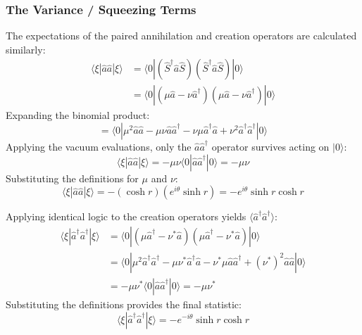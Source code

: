 {\subsubsection{The Variance / Squeezing Terms}
The expectations of the paired annihilation and creation operators are calculated similarly:
\begin{align*}
\langle \xi | \hat{a}\hat{a} | \xi \rangle &= \langle 0 | (\hat{S}^\dagger \hat{a} \hat{S}) (\hat{S}^\dagger \hat{a} \hat{S}) | 0 \rangle \\
&= \langle 0 | (\mu\hat{a} - \nu\hat{a}^\dagger)(\mu\hat{a} - \nu\hat{a}^\dagger) | 0 \rangle
\end{align*}
Expanding the binomial product:
\begin{equation*}
= \langle 0 | \mu^2 \hat{a}\hat{a} - \mu\nu \hat{a}\hat{a}^\dagger - \nu\mu \hat{a}^\dagger\hat{a} + \nu^2 \hat{a}^\dagger\hat{a}^\dagger | 0 \rangle
\end{equation*}
Applying the vacuum evaluations, only the $\hat{a}\hat{a}^\dagger$ operator survives acting on $|0\rangle$:
\begin{equation*}
\langle \xi | \hat{a}\hat{a} | \xi \rangle = -\mu\nu \langle 0 | \hat{a}\hat{a}^\dagger | 0 \rangle = -\mu\nu
\end{equation*}
Substituting the definitions for $\mu$ and $\nu$:
\begin{equation}
\langle \xi | \hat{a}\hat{a} | \xi \rangle = -(\cosh r)(e^{i\theta}\sinh r) = -e^{i\theta}\sinh r \cosh r
\end{equation}

Applying identical logic to the creation operators yields $\langle \hat{a}^\dagger\hat{a}^\dagger \rangle$:
\begin{align*}
\langle \xi | \hat{a}^\dagger\hat{a}^\dagger | \xi \rangle &= \langle 0 | (\mu\hat{a}^\dagger - \nu^*\hat{a})(\mu\hat{a}^\dagger - \nu^*\hat{a}) | 0 \rangle \\
&= \langle 0 | \mu^2 \hat{a}^\dagger\hat{a}^\dagger - \mu\nu^* \hat{a}^\dagger\hat{a} - \nu^*\mu \hat{a}\hat{a}^\dagger + (\nu^*)^2 \hat{a}\hat{a} | 0 \rangle \\
&= -\mu\nu^* \langle 0 | \hat{a}\hat{a}^\dagger | 0 \rangle = -\mu\nu^*
\end{align*}
Substituting the definitions provides the final statistic:
\begin{equation}
\langle \xi | \hat{a}^\dagger\hat{a}^\dagger | \xi \rangle = -e^{-i\theta}\sinh r \cosh r
\end{equation}

}
